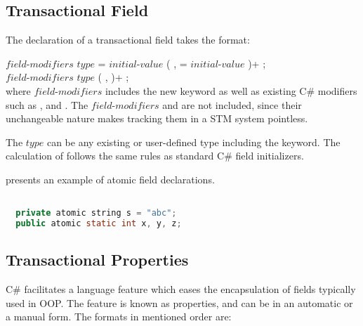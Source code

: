 \subsection{Transactional Field}\label{subsec:design_trans_field}
The declaration of a transactional field takes the format:

$field$-$modifiers$ $type$  = $initial$-$value$ ( ,  = $initial$-$value$ )+ ; \\
$field$-$modifiers$ $type$  ( ,  )+ ; \\
where $field$-$modifiers$ includes the new  keyword as well as existing C\# modifiers such as ,  and . The $field$-$modifiers$  and  are not included, since their unchangeable nature makes tracking them in a \ac{STM} system pointless.

The $type$ can be any existing or user-defined type including the  keyword. The calculation of  follows the same rules as standard C\# field initializers\cite[p. 40]{sestoft2011c}. 

 presents an example of atomic field declarations.

\begin{lstlisting}[label=lst:design_transactional_fields,
  caption={Local Transactional Variable},
  language=Java,  
  showspaces=false,
  showtabs=false,
  breaklines=true,
  showstringspaces=false,
  breakatwhitespace=true,
  commentstyle=\color{greencomments},
  keywordstyle=\color{bluekeywords},
  stringstyle=\color{redstrings},
  morekeywords={atomic, retry, orElse, var, get, set}]  % Start your code-block

  private atomic string s = "abc";
  public atomic static int x, y, z;
\end{lstlisting}

\subsection{Transactional Properties}\label{subsec:design_properties}
C\# facilitates a language feature which eases the encapsulation of fields typically used in \ac{OOP}. The feature is known as properties, and can be in an automatic or a manual form. The formats in mentioned order are\cite[p. 52]{sestoft2011c}:

